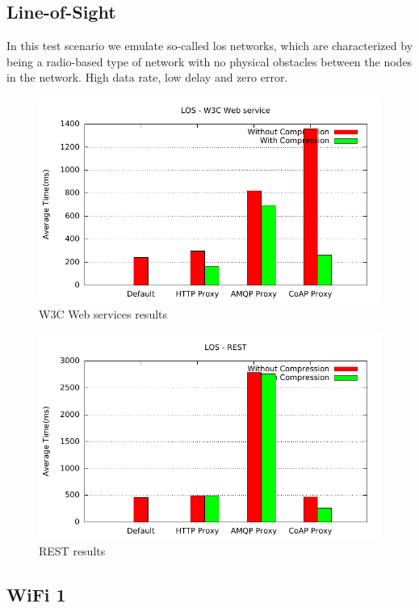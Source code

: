 \subsection{Line-of-Sight}

In this test scenario we emulate so-called \gls{los} networks, which are
characterized by being a radio-based type of network with no physical obstacles
between the nodes in the network. High data rate, low delay and zero error.

\begin{figure}[H]
\center
\includegraphics[scale=0.75]{../results/los/nffi/out.pdf}
\caption{W3C Web services results}
\end{figure}

\begin{figure}[H]
\center
\includegraphics[scale=0.75]{../results/los/rest/out.pdf}
\caption{REST results}
\end{figure}

\subsection{WiFi 1}

